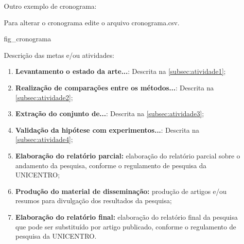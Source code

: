 Outro exemplo de cronograma:

Para alterar o cronograma edite o arquivo cronograma.csv.

{fig_cronograma}


Descrição das metas e/ou atividades:
\begin{enumerate}
    \item \textbf{Levantamento o estado da arte...}: Descrita na \autoref{subsec:atividade1};
    \item \textbf{Realização de comparações entre os métodos...}: Descrita na \autoref{subsec:atividade2};
    \item \textbf{Extração do conjunto de...}: Descrita na \autoref{subsec:atividade3};    
    \item \textbf{Validação da hipótese com experimentos...}: Descrita na \autoref{subsec:atividade4};
    \item \textbf{Elaboração do relatório parcial:} elaboração do relatório parcial sobre o andamento da pesquisa, conforme o regulamento de pesquisa da UNICENTRO;
    \item \textbf{Produção do material de disseminação:} produção de artigos e/ou resumos para divulgação dos resultados da pesquisa;
    \item \textbf{Elaboração do relatório final:} elaboração do relatório final da pesquisa que pode ser substituído por artigo publicado, conforme o regulamento de pesquisa da UNICENTRO.
\end{enumerate}